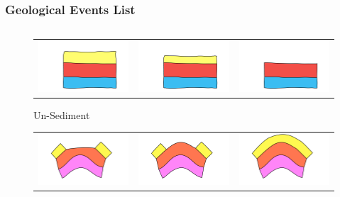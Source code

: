 \documentclass{beamer}
\begin{document}
	
	\begin{frame}
	\frametitle{Geological Events List}
	\begin{columns}
	\begin{column}{0.55\textwidth}
	\begin{figure}[H]
	\centering
	\begin{tabular}{@{}ccc@{}}
	\includegraphics[width=.34\textwidth]{unSedimentDescription0.png}&
	\includegraphics[width=.34\textwidth]{unSedimentDescription1.png}&
	\includegraphics[width=.34\textwidth]{unSedimentDescription2.png}\\
	\end{tabular}
	\caption{Un-Sediment}
	\label{unsedeg2}
	\end{figure}
	\begin{figure}[H]
	\centering
	\begin{tabular}{@{}ccc@{}}
	\includegraphics[width=.34\textwidth]	{unErodeConvexDescription0.png}&
	\includegraphics[width=.34\textwidth]{unErodeConvexDescription1.png}&
	\includegraphics[width=.34\textwidth]	{unErodeConvexDescription2.png}\\

\end{tabular}
\end{figure}
\end{column}
\end{columns}
\end{frame}
\end{document}
